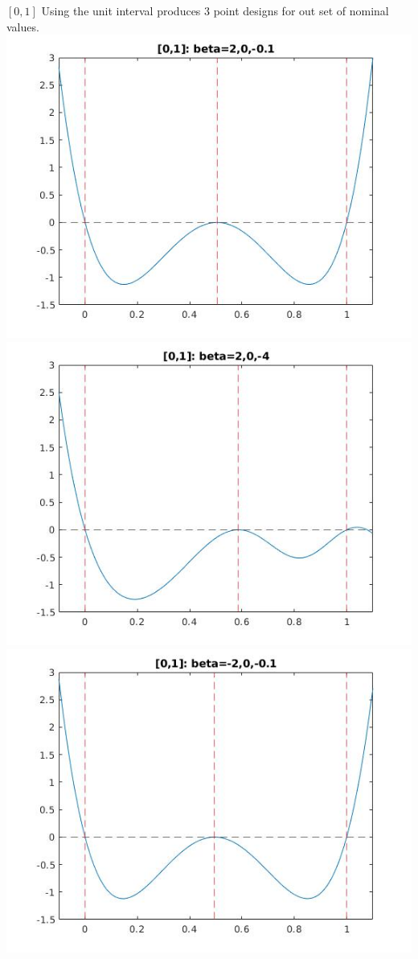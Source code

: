 \documentclass[11pt]{beamer}
\begin{document}
\begin{frame}{$[0,1]$}
Using the unit interval produces 3 point designs for out set of nominal values.\\
\includegraphics[scale=0.2]{quadplots/01_1.jpg}
\includegraphics[scale=0.2]{quadplots/01_2.jpg}\\
\includegraphics[scale=0.2]{quadplots/01_3.jpg}

\end{frame}
\end{document}

